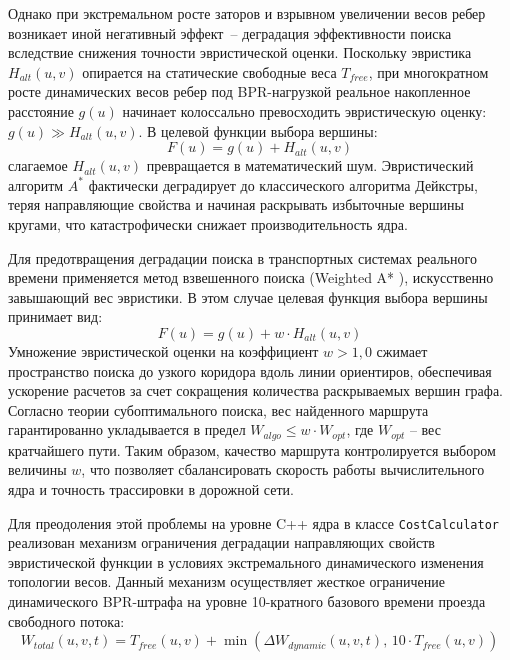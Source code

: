 Однако при экстремальном росте заторов и взрывном увеличении весов ребер возникает иной негативный эффект~-- деградация эффективности поиска вследствие снижения точности эвристической оценки. Поскольку эвристика $H_{alt}(u, v)$ опирается на статические свободные веса $T_{free}$, при многократном росте динамических весов ребер под BPR-нагрузкой реальное накопленное расстояние $g(u)$ начинает колоссально превосходить эвристическую оценку: $g(u) \gg H_{alt}(u, v)$. В целевой функции выбора вершины:
\begin{equation}
    F(u) = g(u) + H_{alt}(u, v)
\end{equation}
слагаемое $H_{alt}(u, v)$ превращается в математический шум. Эвристический алгоритм $A^*$ фактически деградирует до классического алгоритма Дейкстры, теряя направляющие свойства и начиная раскрывать избыточные вершины кругами, что катастрофически снижает производительность ядра.

Для предотвращения деградации поиска в транспортных системах реального времени применяется метод взвешенного поиска (Weighted A* \cite{goldberg2004alt}), искусственно завышающий вес эвристики. В этом случае целевая функция выбора вершины принимает вид:
\begin{equation}
    F(u) = g(u) + w \cdot H_{alt}(u, v)
\end{equation}
Умножение эвристической оценки на коэффициент $w > 1{,}0$ сжимает пространство поиска до узкого коридора вдоль линии ориентиров, обеспечивая ускорение расчетов за счет сокращения количества раскрываемых вершин графа. Согласно теории субоптимального поиска, вес найденного маршрута гарантированно укладывается в предел $W_{algo} \le w \cdot W_{opt}$, где $W_{opt}$ -- вес кратчайшего пути. Таким образом, качество маршрута контролируется выбором величины $w$, что позволяет сбалансировать скорость работы вычислительного ядра и точность трассировки в дорожной сети.

Для преодоления этой проблемы на уровне C++ ядра в классе \texttt{CostCalculator} реализован механизм ограничения деградации направляющих свойств эвристической функции в условиях экстремального динамического изменения топологии весов. Данный механизм осуществляет жесткое ограничение динамического BPR-штрафа на уровне 10-кратного базового времени проезда свободного потока:
\begin{equation}
    W_{total}(u, v, t) = T_{free}(u, v) + \min\left( \Delta W_{dynamic}(u, v, t),\, 10 \cdot T_{free}(u, v) \right)
\end{equation}

